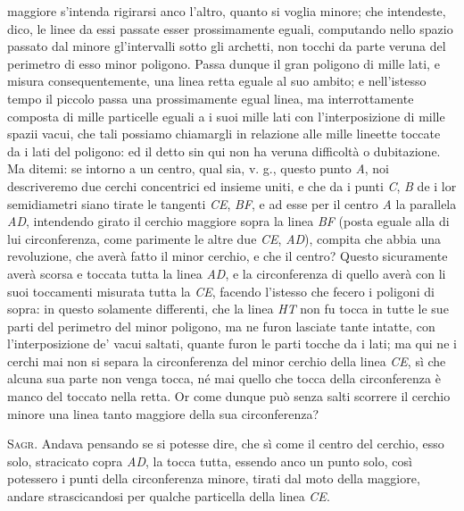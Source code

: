 \documentclass[11pt,twoside,openany]{book}
\newcommand{\speaker}[1]{\textcolor{rubric}{\textsc{#1}}\space}
\begin{document}
maggiore s'intenda rigirarsi anco l'altro, quanto si voglia minore; che intendeste, dico, le linee da essi passate esser prossimamente eguali, computando nello spazio passato dal minore gl'intervalli sotto gli archetti, non tocchi da parte veruna del perimetro di esso minor poligono. Passa dunque il gran poligono di mille lati, e misura consequentemente, una linea retta eguale al suo ambito; e nell'istesso tempo il piccolo passa una prossimamente egual linea, ma interrottamente composta di mille particelle eguali a i suoi mille lati con l'interposizione di mille spazii vacui, che tali possiamo chiamargli in relazione alle mille lineette toccate da i lati del poligono: ed il detto sin qui non ha veruna difficoltà o dubitazione. Ma ditemi: se intorno a un centro, qual sia, v. g., questo punto \emph{A}, noi descriveremo due cerchi concentrici ed insieme uniti, e che da i punti \emph{C}, \emph{B} de i lor semidiametri siano tirate le tangenti \emph{CE}, \emph{BF}, e ad esse per il centro \emph{A} la parallela \emph{AD}, intendendo girato il cerchio maggiore sopra la linea \emph{BF} (posta eguale alla di lui circonferenza, come parimente le altre due \emph{CE}, \emph{AD}), compita che abbia una revoluzione, che averà fatto il minor cerchio, e che il centro? Questo sicuramente averà scorsa e toccata tutta la linea \emph{AD}, e la circonferenza di quello averà con li suoi toccamenti misurata tutta la \emph{CE}, facendo l'istesso che fecero i poligoni di sopra: in questo solamente differenti, che la linea \emph{HT} non fu tocca in tutte le sue parti del perimetro del minor poligono, ma ne furon lasciate tante intatte, con l'interposizione de' vacui saltati, quante furon le parti tocche da i lati; ma qui ne i cerchi mai non si separa la circonferenza del minor cerchio della linea \emph{CE}, sì che alcuna sua parte non venga tocca, né mai quello che tocca della circonferenza è manco del toccato nella retta. Or come dunque può senza salti scorrere il cerchio minore una linea tanto maggiore della sua circonferenza?

\speaker{Sagr.} Andava pensando se si potesse dire, che sì come il centro del cerchio, esso solo, stracicato copra \emph{AD}, la tocca tutta, essendo anco un punto solo, così potessero i punti della circonferenza minore, tirati dal moto della maggiore, andare strascicandosi per qualche particella della linea \emph{CE}.
\end{document}
